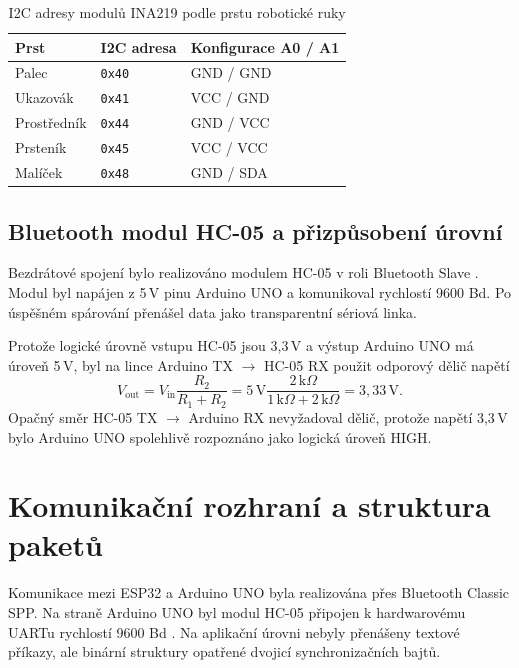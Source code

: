 \begin{table}[htbp]
\centering
\caption{I2C adresy modulů INA219 podle prstu robotické ruky}
\label{tab:ina219}
\begin{tabular}{|p{}|p{}|p{}|}
\hline
\textbf{Prst} & \textbf{I2C adresa} & \textbf{Konfigurace A0 / A1} \\
\hline
Palec & \texttt{0x40} & GND / GND \\
\hline
Ukazovák & \texttt{0x41} & VCC / GND \\
\hline
Prostředník & \texttt{0x44} & GND / VCC \\
\hline
Prsteník & \texttt{0x45} & VCC / VCC \\
\hline
Malíček & \texttt{0x48} & GND / SDA \\
\hline
\end{tabular}
\end{table}

\subsection{Bluetooth modul HC-05 a přizpůsobení úrovní}
\label{subsec:hc05}

Bezdrátové spojení bylo realizováno modulem HC-05 v roli Bluetooth Slave \cite{Sadun2016711}. Modul byl napájen z 5\,V pinu Arduino UNO a komunikoval rychlostí 9600 Bd. Po úspěšném spárování přenášel data jako transparentní sériová linka.

Protože logické úrovně vstupu HC-05 jsou 3,3\,V a výstup Arduino UNO má úroveň 5\,V, byl na lince Arduino TX $\rightarrow$ HC-05 RX použit odporový dělič napětí
\begin{equation}
    V_{\mathrm{out}} = V_{\mathrm{in}} \frac{R_2}{R_1 + R_2}
    = 5\,\mathrm{V}\frac{2\,\mathrm{k}\Omega}{1\,\mathrm{k}\Omega + 2\,\mathrm{k}\Omega}
    = 3{,}33\,\mathrm{V}.
\end{equation}
Opačný směr HC-05 TX $\rightarrow$ Arduino RX nevyžadoval dělič, protože napětí 3,3\,V bylo Arduino UNO spolehlivě rozpoznáno jako logická úroveň HIGH.

\section{Komunikační rozhraní a struktura paketů}
\label{sec:komunikacni-rozhrani}

Komunikace mezi ESP32 a Arduino UNO byla realizována přes Bluetooth Classic SPP\@. Na straně Arduino UNO byl modul HC-05 připojen k hardwarovému UARTu rychlostí 9600 Bd \cite{hc05_components101}. Na aplikační úrovni nebyly přenášeny textové příkazy, ale binární struktury opatřené dvojicí synchronizačních bajtů.

